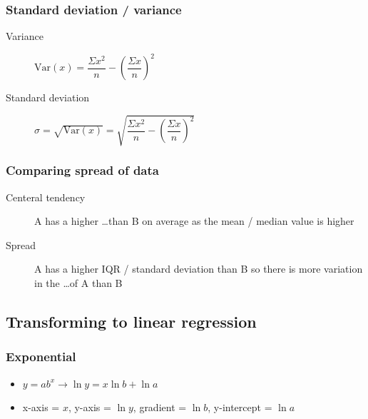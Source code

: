 \documentclass[A4paper, 11pt]{article}
\begin{document}
	\subsubsection{Standard deviation / variance}
	\begin{description}
		\item[Variance] $\mathrm{Var}(x)=\dfrac{\Sigma x^2}{n} - (\dfrac{\Sigma x}{n})^2$
		\item[Standard deviation] $\sigma=\sqrt{\mathrm{Var}(x)}=\sqrt{\dfrac{\Sigma x^2}{n} - (\dfrac{\Sigma x}{n})^2}$
	\end{description}
	
	
	\subsubsection{Comparing spread of data}
	\begin{description}
		\item[Centeral tendency] A has a higher \dots than B on average as the mean / median value is higher
		\item[Spread] A has a higher IQR / standard deviation than B so there is more variation in the \dots of A than B
	\end{description}
	
	\subsection{Transforming to linear regression}
	\subsubsection{Exponential}
	\begin{itemize}
		\item $y=ab^x\rightarrow\ln y = x\ln b + \ln a$
		\item x-axis = $x$, y-axis = $\ln y$, gradient = $\ln b$, y-intercept = $\ln a$
	\end{itemize}
\end{document}
